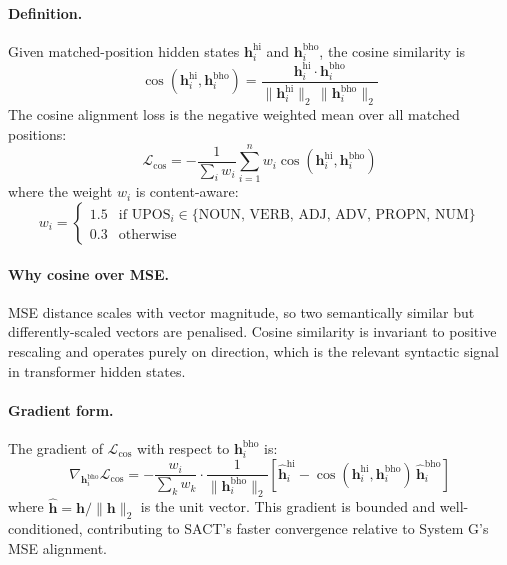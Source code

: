 \documentclass[12pt,a4paper,oneside]{report}
\begin{document}
\paragraph{Definition.} Given matched-position hidden states
$\mathbf{h}^{\text{hi}}_i$ and $\mathbf{h}^{\text{bho}}_i$, the cosine
similarity is
\begin{equation}
  \cos(\mathbf{h}^{\text{hi}}_i, \mathbf{h}^{\text{bho}}_i) =
    \frac{\mathbf{h}^{\text{hi}}_i \cdot \mathbf{h}^{\text{bho}}_i}
         {\|\mathbf{h}^{\text{hi}}_i\|_2 \, \|\mathbf{h}^{\text{bho}}_i\|_2}
\end{equation}
The cosine alignment loss is the negative weighted mean over all matched
positions:
\begin{equation}
  \mathcal{L}_{\text{cos}} = -\frac{1}{\sum_i w_i}
     \sum_{i=1}^{n} w_i \cos(\mathbf{h}^{\text{hi}}_i, \mathbf{h}^{\text{bho}}_i)
\end{equation}
where the weight $w_i$ is content-aware:
\begin{equation}
  w_i = \begin{cases}
    1.5 & \text{if } \text{UPOS}_i \in \{\text{NOUN, VERB, ADJ, ADV, PROPN, NUM}\}\\
    0.3 & \text{otherwise}
  \end{cases}
\end{equation}

\paragraph{Why cosine over MSE.}
MSE distance scales with vector magnitude, so two semantically similar but
differently-scaled vectors are penalised. Cosine similarity is invariant to
positive rescaling and operates purely on direction, which is the relevant
syntactic signal in transformer hidden states.

\paragraph{Gradient form.}
The gradient of $\mathcal{L}_{\text{cos}}$ with respect to
$\mathbf{h}^{\text{bho}}_i$ is:
\begin{equation}
  \nabla_{\mathbf{h}^{\text{bho}}_i} \mathcal{L}_{\text{cos}} =
    -\frac{w_i}{\sum_k w_k} \cdot
    \frac{1}{\|\mathbf{h}^{\text{bho}}_i\|_2}
    \left[\hat{\mathbf{h}}^{\text{hi}}_i -
          \cos(\mathbf{h}^{\text{hi}}_i, \mathbf{h}^{\text{bho}}_i)
          \, \hat{\mathbf{h}}^{\text{bho}}_i\right]
\end{equation}
where $\hat{\mathbf{h}} = \mathbf{h}/\|\mathbf{h}\|_2$ is the unit vector. This
gradient is bounded and well-conditioned, contributing to SACT's faster
convergence relative to System G's MSE alignment.
\end{document}
